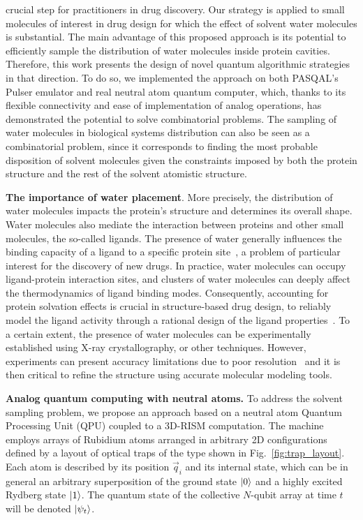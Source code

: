 \documentclass[fleqn,10pt]{wlscirep}
\begin{document}
crucial step for practitioners in drug discovery. Our strategy is applied to small molecules of interest in drug design for which the effect of solvent water molecules is substantial. The main advantage of this proposed approach is its potential to efficiently sample the distribution of water molecules inside protein cavities.  Therefore, this work presents the design of novel quantum algorithmic strategies in that direction. To do so, we implemented the approach on both PASQAL’s Pulser emulator and real neutral atom quantum computer, which, thanks to its flexible connectivity and ease of implementation of analog operations, has demonstrated the potential to solve combinatorial problems. The sampling of water molecules in biological systems distribution can also be seen as a combinatorial problem, since it corresponds to finding the most probable disposition of solvent molecules given the constraints imposed by both the protein structure and the rest of the solvent atomistic structure.





\textbf{The importance of water placement}. More precisely, the distribution of water molecules impacts the protein's structure and determines its overall shape. Water molecules also mediate the interaction between proteins and other small molecules, the so-called
ligands. The presence of water generally influences the binding capacity of a ligand to a specific protein site~\cite{Samways2021,Bucher2018}, a problem of particular interest for the discovery of new drugs. In practice, water molecules can occupy ligand-protein interaction sites, and clusters of water molecules can deeply affect the thermodynamics of ligand binding modes. Consequently, accounting for protein solvation effects is crucial in structure-based drug design, to reliably model the ligand activity through a rational design of the ligand properties~\cite{Samways2021,Bucher2018}. To a certain extent, the presence of water molecules can be experimentally established using X-ray crystallography, or other techniques. However, experiments can present accuracy limitations due to poor resolution~\cite{Wlodawer2008} and it is then critical to refine the structure using accurate molecular modeling tools.


\textbf{Analog quantum computing with neutral atoms.} To address the solvent sampling problem, we propose an approach based on a neutral atom Quantum Processing Unit (QPU) coupled to a 3D-RISM computation. The machine employs arrays of Rubidium atoms arranged in arbitrary 2D configurations defined by a layout of optical traps of the type shown in Fig.~\ref{fig:trap_layout}. Each atom is described by its position $\vec{q}_i$ and its internal state, which can be in general an arbitrary superposition of the ground state $\ket{0}$ and a highly excited Rydberg state $\ket{1}$. The quantum state of the collective $N$-qubit array at time $t$ will be denoted $\ket{\psi_t}$. 
\end{document}
